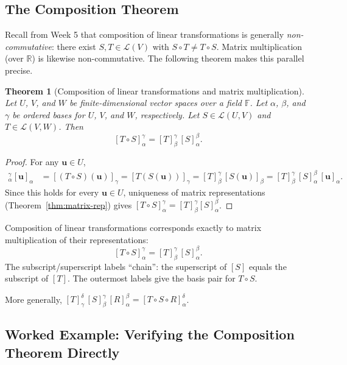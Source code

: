\documentclass[11pt, a4paper, notitlepage]{report}
\newtheorem{theorem}{Theorem}[section]
\theoremstyle{definition}
\theoremstyle{remark}
\begin{document}
\subsection{The Composition Theorem}

Recall from Week 5 that composition of linear transformations is generally
\emph{non-commutative}: there exist $S, T \in \mathcal{L}(V)$ with $S \circ T \neq T \circ S$.
Matrix multiplication (over $\mathbb{R}$) is likewise non-commutative.  The following theorem
makes this parallel precise.

\begin{theorem}[Composition of linear transformations and matrix multiplication]
\label{thm:composition-matrix-mult}
Let $U$, $V$, and $W$ be finite-dimensional vector spaces over a field $\mathbb{F}$.  Let
$\alpha$, $\beta$, and $\gamma$ be ordered bases for $U$, $V$, and $W$, respectively.  Let
$S \in \mathcal{L}(U, V)$ and $T \in \mathcal{L}(V, W)$.  Then
\[
  [T \circ S]_\alpha^\gamma = [T]_\beta^\gamma \, [S]_\alpha^\beta.
\]
\end{theorem}

\begin{proof}
For any $\mathbf{u} \in U$,
\begin{align*}
  [T \circ S]_\alpha^\gamma [\mathbf{u}]_\alpha
  &= [(T \circ S)(\mathbf{u})]_\gamma
   = [T(S(\mathbf{u}))]_\gamma
   = [T]_\beta^\gamma \, [S(\mathbf{u})]_\beta
   = [T]_\beta^\gamma \, [S]_\alpha^\beta \, [\mathbf{u}]_\alpha.
\end{align*}
Since this holds for every $\mathbf{u} \in U$, uniqueness of matrix representations
(Theorem~\ref{thm:matrix-rep}) gives $[T \circ S]_\alpha^\gamma = [T]_\beta^\gamma [S]_\alpha^\beta$.
\end{proof}

\begin{keyresult}[title={Key Result: Matrix Multiplication $=$ Composition}]
Composition of linear transformations corresponds exactly to matrix multiplication of their
representations:
\[
  [T \circ S]_\alpha^\gamma = [T]_\beta^\gamma \,[S]_\alpha^\beta.
\]
The subscript/superscript labels ``chain'': the superscript of $[S]$ equals the subscript of
$[T]$.  The outermost labels give the basis pair for $T \circ S$.

More generally, $[T]_\gamma^\delta \,[S]_\beta^\gamma \,[R]_\alpha^\beta = [T\circ S\circ R]_\alpha^\delta$.
\end{keyresult}

\subsection{Worked Example: Verifying the Composition Theorem Directly}
\end{document}
